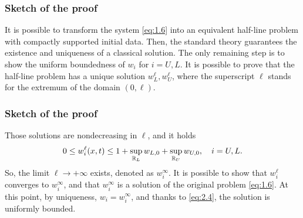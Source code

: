 
\begin{frame}
    \frametitle{Sketch of the proof}
    \begin{proofs}
        It is possible to transform the system \ref{eq:1.6} into an equivalent half-line problem with compactly supported initial data. Then, the standard theory guarantees the existence and uniqueness of a classical solution. The only remaining step is to show the uniform boundedness of \(w_i\) for \(i = U, L\).
        It is possible to prove that the half-line problem has a unique solution \(w_L^\ell, w_{U}^\ell\), where the superscript \(\ell\) stands for the extremum of the domain \((0, \ell)\). 
    \end{proofs}
\end{frame}

\begin{frame}
    \frametitle{Sketch of the proof}
    \begin{proofe}
        Those solutions are nondecreasing in \(\ell\), and it holds 
        \begin{equation}
            0 \leq w_i^\ell(x,t) \leq 1 + \sup_{\mathbb{R}_L} w_{L,0} + \sup_{\mathbb{R}_{U}} w_{U,0}, \quad i = U, L.
            \label{eq:2.4}
        \end{equation}
        So, the limit \(\ell \to +\infty\) exists, denoted as \(w_i^\infty\).
        It is possible to show that \(w_i^\ell\) converges to \(w_i^\infty\), and that \(w_i^\infty\) is a solution of the original problem \ref{eq:1.6}. 
        At this point, by uniqueness, \(w_i = w_i^\infty\), and thanks to \eqref{eq:2.4}, the solution is uniformly bounded.
    \end{proofe}
\end{frame}
    